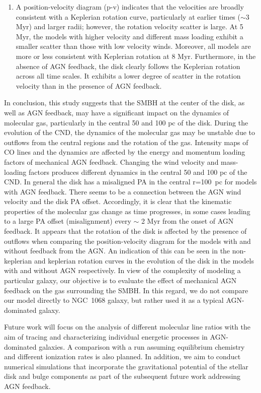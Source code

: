 \documentclass[fleqn,usenatbib]{mnras}
\begin{document}
\begin{enumerate}
       \item
        A position-velocity diagram (p-v) indicates that the velocities are broadly consistent with a Keplerian rotation curve, particularly at earlier times ($\sim$3 Myr) and larger radii; however, the rotation velocity scatter is large. 
        At 5 Myr, the models with higher velocity and different mass loading exhibit a smaller scatter than those with low velocity winds. Moreover, all models are more or less consistent with Keplerian rotation at 8 Myr. Furthermore, in the absence of AGN feedback, the disk clearly follows the Keplerian rotation across all time scales. It exhibits a lower degree of scatter in the rotation velocity than in the presence of AGN feedback. 
        	        
    \end{enumerate}

    In conclusion, this study suggests that the SMBH at the center of the disk, as well as AGN feedback, may have a significant impact on the dynamics of molecular gas, particularly in the central 50 and 100 pc of the disk. During the evolution of the CND, the dynamics of the molecular gas may be unstable due to outflows from  the central regions and the rotation of the gas. Intensity maps of CO lines and the dynamics are affected by the energy and momentum loading factors of mechanical AGN feedback. Changing the wind velocity and mass-loading factors produces different dynamics in the central 50 and 100 pc of the CND. In general the disk has a misaligned PA in the central r=100~pc for models with AGN feedback. There seems to be a connection between the AGN wind velocity and the disk PA offset. Accordingly, it is clear that the kinematic properties of the molecular gas change as time progresses, in some cases leading to a large PA offset (misalignment) every $\sim$ 2 Myr from the onset of AGN feedback.
    It appears that the rotation of the disk is affected by the presence of outflows when comparing the position-velocity diagram for the models with and without feedback from the AGN. An indication of this can be seen in the non-keplerian and keplerian rotation curves in the evolution of the disk in the models with and without AGN respectively. 
    In view of the complexity of modeling a particular galaxy, our objective is to evaluate the effect of mechanical AGN feedback on the gas surrounding the SMBH. In this regard, we do not compare our model directly to NGC~1068 galaxy, but rather used it as a typical AGN-dominated galaxy.

    Future work will focus on the analysis of different molecular line ratios with the aim of tracing and characterizing individual energetic processes in AGN-dominated galaxies. A comparison with a run assuming equilibrium chemistry and different ionization rates is also planned. In addition, we aim to conduct numerical simulations that incorporate the gravitational potential of the stellar disk and bulge components as part of the subsequent future work addressing AGN feedback.
\end{document}
